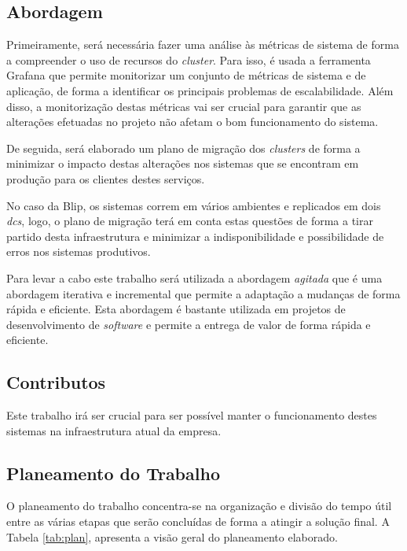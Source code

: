 \subsection{Abordagem}

Primeiramente, será necessária fazer uma análise às métricas de sistema de forma a compreender
o uso de recursos do \textit{\gls{cluster}}. Para isso, é usada a ferramenta Grafana que permite
monitorizar um conjunto de métricas de sistema e de aplicação, de forma a identificar os principais
problemas de escalabilidade. Além disso, a monitorização destas métricas vai ser crucial para
garantir que as alterações efetuadas no projeto não afetam o bom funcionamento do sistema.

De seguida, será elaborado um plano de migração dos \textit{\glspl{cluster}} de forma a minimizar o 
impacto destas alterações nos sistemas que se encontram em produção para os clientes destes serviços.

No caso da Blip, os sistemas correm em vários ambientes e replicados em dois \textit{\glspl{dc}},
logo, o plano de migração terá em conta estas questões de forma a tirar partido desta infraestrutura
e minimizar a indisponibilidade e possibilidade de erros nos sistemas produtivos.

Para levar a cabo este trabalho será utilizada a abordagem \textit{agitada} que é uma abordagem
iterativa e incremental que permite a adaptação a mudanças de forma rápida e eficiente. Esta abordagem
é bastante utilizada em projetos de desenvolvimento de \textit{software} e permite a entrega de valor
de forma rápida e eficiente.

\subsection{Contributos}

Este trabalho irá ser crucial para ser possível manter o funcionamento destes sistemas na
infraestrutura atual da empresa.


\subsection{Planeamento do Trabalho}

O planeamento do trabalho concentra-se na organização e divisão do tempo útil entre as várias etapas
que serão concluídas de forma a atingir a solução final. A Tabela \ref{tab:plan}, apresenta a visão
geral do planeamento elaborado.

